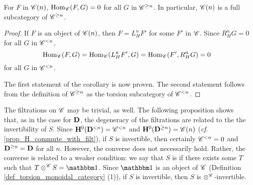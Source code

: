 \begin{cor}\label{cor_sg_sub_prerad}
For $F$ in $\SGFilt{n}{\Cat{C}}$, $\hom_{\Cat{C}}(F, G) = 0$ for
all $G$ in $\Prerad{n}{\Cat{C}}$. In particular, $\SGFilt{n}{\Cat{C}}$
is a full subcategory of $\Prerad{n}{\Cat{C}}$.
\end{cor}
\begin{proof}
If $F$ is an object of $\SGFilt{n}{\Cat{C}}$, then $F = L_H^n F'$ for
some $F'$ in $\Cat{C}$. Since $R_H^n G = 0$ for all $G$ in 
$\Corad{n}{\Cat{C}}$,
\[
\hom_{\Cat{C}}(F, G) = \hom_{\Cat{C}}(L_H^n F', G) = \hom_{\Cat{C}}(F', R_H^n G) = 0
\]
for all $G$ in $\Corad{n}{\Cat{C}}$.

The first statement of the corollary is now proven. The second 
statement follows from the definition of $\Prerad{n}{\Cat{C}}$ as 
the torsion subcategory of $\Corad{n}{\Cat{C}}$.
\end{proof}

The filtrations on $\Cat{C}$ may be trivial, as well. The following
proposition shows that, as in the case for $\DCat$, the degeneracy
of the filtrations are related to the the invertibility of $S$.
Since $\HH^0(\Corad{n}{\DCat}) = \Corad{n}{\Cat{C}}$ and
$\HH^0(\Prerad{n}{\DCat}) = \SGFilt{n}{\Cat{C}}$ (\emph{cf}. 
\ref{prop_H_commute_with_filt}), if $S$ is invertible, then certainly
$\Corad{n}{\Cat{C}} = 0$ and $\Prerad{n}{\DCat} = \DCat$ for all $n$.
However, the converse does not necessarily hold. Rather, the converse
is related to a weaker condition: we say that $S$ is 
 if there exists some $T$ such
that $T \tensor^{\Cat{C}} S = \Unit$. Since $\Unit$ is an object of
$\Cat{C}$ (Definition \ref{def_torsion_monoidal_category} (1)), if
$S$ is invertible, then $S$ is $\tensor^{\Cat{C}}$-invertible.

